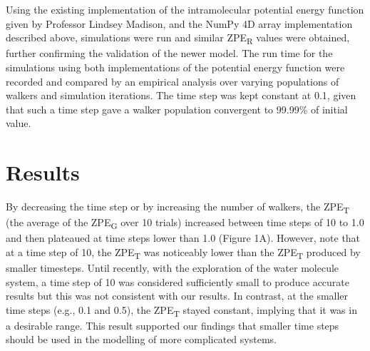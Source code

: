 \documentclass[journal=jacsat,manuscript=article]{achemso}
\begin{document}
Using the existing implementation of the intramolecular potential energy function given by Professor Lindsey Madison, and the NumPy 4D array implementation described above, simulations were run and similar ZPE\textsubscript{R} values were obtained, further confirming the validation of the newer model. The run time for the simulations using both implementations of the potential energy function were recorded and compared by an empirical analysis over varying populations of walkers and simulation iterations. The time step was kept constant at 0.1, given that such a time step gave a walker population convergent to 99.99\% of initial value.

\section{Results}

By decreasing the time step or by increasing the number of walkers, the ZPE\textsubscript{T} (the average of the ZPE\textsubscript{G} over 10 trials) increased between time steps of 10 to 1.0 and then plateaued at time steps lower than 1.0 (Figure 1A). However, note that at a time step of 10, the ZPE\textsubscript{T} was noticeably lower than the ZPE\textsubscript{T} produced by smaller timesteps. Until recently, with the exploration of the water molecule system, a time step of 10 was considered sufficiently small to produce accurate results but this was not consistent with our results. In contrast, at the smaller time steps (e.g., 0.1 and 0.5), the ZPE\textsubscript{T} stayed constant, implying that it was in a desirable range. This result supported our findings that smaller time steps should be used in the modelling of more complicated systems. 
\end{document}

